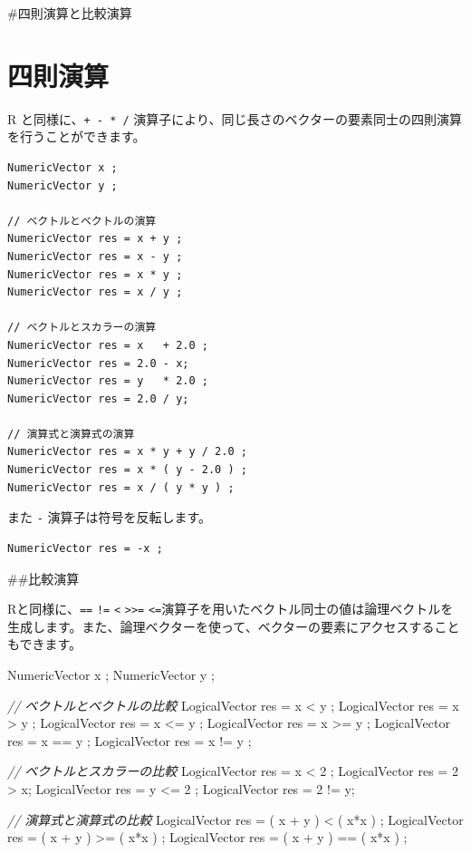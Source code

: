 \documentclass[]{book}
\newenvironment{Shaded}{\begin{snugshade}}{\end{snugshade}}
\newcommand{\CommentTok}[1]{\textcolor[rgb]{0.56,0.35,0.01}{\textit{#1}}}
\newcommand{\DecValTok}[1]{\textcolor[rgb]{0.00,0.00,0.81}{#1}}
\newcommand{\NormalTok}[1]{#1}
\begin{document}
\#四則演算と比較演算

\section{四則演算}

R と同様に、\texttt{+\ -\ *\ /} 演算子により、同じ長さのベクターの要素同士の四則演算を行うことができます。

\begin{verbatim}
NumericVector x ;
NumericVector y ;

// ベクトルとベクトルの演算
NumericVector res = x + y ;
NumericVector res = x - y ;
NumericVector res = x * y ;
NumericVector res = x / y ;

// ベクトルとスカラーの演算
NumericVector res = x   + 2.0 ;
NumericVector res = 2.0 - x;
NumericVector res = y   * 2.0 ;
NumericVector res = 2.0 / y;

// 演算式と演算式の演算
NumericVector res = x * y + y / 2.0 ;
NumericVector res = x * ( y - 2.0 ) ;
NumericVector res = x / ( y * y ) ;
\end{verbatim}

また \texttt{-} 演算子は符号を反転します。

\begin{verbatim}
NumericVector res = -x ;
\end{verbatim}

\#\#比較演算

Rと同様に、\texttt{==} \texttt{!=} \texttt{\textless{}} \texttt{\textgreater{}\textasciigrave{}\textasciigrave{}\textgreater{}=} \texttt{\textless{}=}演算子を用いたベクトル同士の値は論理ベクトルを生成します。また、論理ベクターを使って、ベクターの要素にアクセスすることもできます。

\begin{Shaded}
\begin{Highlighting}[]
\NormalTok{NumericVector x ;}
\NormalTok{NumericVector y ;}

\CommentTok{// ベクトルとベクトルの比較}
\NormalTok{LogicalVector res = x < y ;}
\NormalTok{LogicalVector res = x > y ;}
\NormalTok{LogicalVector res = x <= y ;}
\NormalTok{LogicalVector res = x >= y ;}
\NormalTok{LogicalVector res = x == y ;}
\NormalTok{LogicalVector res = x != y ;}

\CommentTok{// ベクトルとスカラーの比較}
\NormalTok{LogicalVector res = x < }\DecValTok{2}\NormalTok{ ;}
\NormalTok{LogicalVector res = }\DecValTok{2}\NormalTok{ > x;}
\NormalTok{LogicalVector res = y <= }\DecValTok{2}\NormalTok{ ;}
\NormalTok{LogicalVector res = }\DecValTok{2}\NormalTok{ != y;}

\CommentTok{// 演算式と演算式の比較}
\NormalTok{LogicalVector res = ( x + y ) < ( x*x ) ;}
\NormalTok{LogicalVector res = ( x + y ) >= ( x*x ) ;}
\NormalTok{LogicalVector res = ( x + y ) == ( x*x ) ;}
\end{Highlighting}
\end{Shaded}
\end{document}
